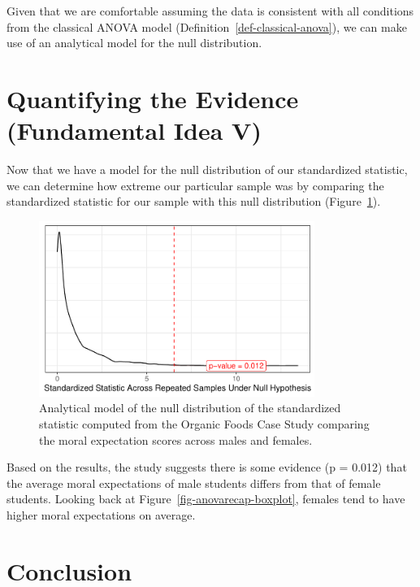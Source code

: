 \documentclass[
  letterpaper,
  DIV=11,
  numbers=noendperiod]{scrreprt}
\theoremstyle{definition}
\theoremstyle{definition}
\theoremstyle{plain}
\theoremstyle{remark}
\begin{document}
Given that we are comfortable assuming the data is consistent with all
conditions from the classical ANOVA model
(Definition~\ref{def-classical-anova}), we can make use of an analytical
model for the null distribution.

\hypertarget{quantifying-the-evidence-fundamental-idea-v-1}{%
\section{Quantifying the Evidence (Fundamental Idea
V)}\label{quantifying-the-evidence-fundamental-idea-v-1}}

Now that we have a model for the null distribution of our standardized
statistic, we can determine how extreme our particular sample was by
comparing the standardized statistic for our sample with this null
distribution (Figure~\ref{fig-anovarecap-null-distribution}).

\begin{figure}

{\centering \includegraphics[width=0.8\textwidth,height=\textheight]{./images/fig-anovarecap-null-distribution-1.pdf}

}

\caption{\label{fig-anovarecap-null-distribution}Analytical model of the
null distribution of the standardized statistic computed from the
Organic Foods Case Study comparing the moral expectation scores across
males and females.}

\end{figure}

Based on the results, the study suggests there is some evidence (p =
0.012) that the average moral expectations of male students differs from
that of female students. Looking back at
Figure~\ref{fig-anovarecap-boxplot}, females tend to have higher moral
expectations on average.

\hypertarget{conclusion}{%
\section{Conclusion}\label{conclusion}}
\end{document}
